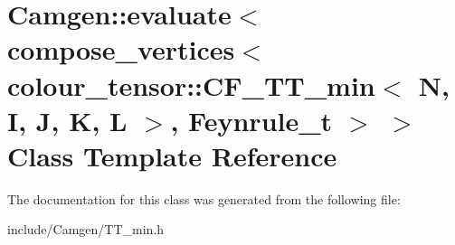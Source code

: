 \hypertarget{a00162}{\section{Camgen\-:\-:evaluate$<$ compose\-\_\-vertices$<$ colour\-\_\-tensor\-:\-:C\-F\-\_\-\-T\-T\-\_\-min$<$ N, I, J, K, L $>$, Feynrule\-\_\-t $>$ $>$ Class Template Reference}
\label{a00162}
}


The documentation for this class was generated from the following file\-:\begin{DoxyCompactItemize}
\item 
include/\-Camgen/T\-T\-\_\-min.\-h\end{DoxyCompactItemize}
